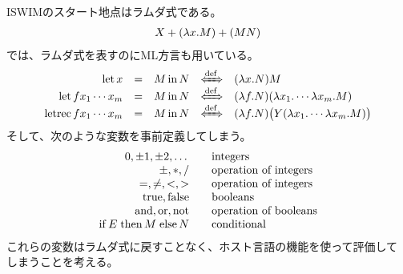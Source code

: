{	ISWIMのスタート地点はラムダ式である。
	\begin{equation*}\begin{split}
		X + (\lambda{x}.M) + (MN)
	\end{split}\end{equation*}
	\cite{lawrence2000}では、ラムダ式を表すのにML方言も用いている。
	\begin{equation*}\begin{array}{rclcl}
		\mlLet x &=& M \mlin N &\xiff{\dfn}& (\lmd{x}N)M \\
		\mlLet f x_1 \cdots x_m &=& M \mlin N 
			&\xiff{\dfn}& (\lmd{f}N)(\lmd{x_1}\cdots\lmd{x_m}M) \\
		\mlLetrec f x_1 \cdots x_m &=& M \mlin N 
			&\xiff{\dfn}& (\lmd{f}N)\bigl(Y(\lmd{x_1}\cdots\lmd{x_m}M)\bigr) \\
	\end{array}\end{equation*}
	そして、次のような変数を事前定義してしまう。
	\begin{equation*}\begin{array}{rl}
		0,\pm1,\pm2,\dots & \quad\text{integers} \\
		\pm,*,/ & \quad\text{operation of integers} \\
		=,\neq,<,> & \quad\text{operation of integers} \\
		{\operatorname{true}},{\operatorname{false}} & \quad\text{booleans} \\
		{\operatorname{and}},{\operatorname{or}},{\operatorname{not}} & \quad\text{operation of booleans} \\
		{\operatorname{if}}\, E\; {\operatorname{then}}\, M\; {\operatorname{else}}\, N & \quad\text{conditional} \\
	\end{array}\end{equation*}
	これらの変数はラムダ式に戻すことなく、ホスト言語の機能を使って評価して
	しまうことを考える。
	
}
